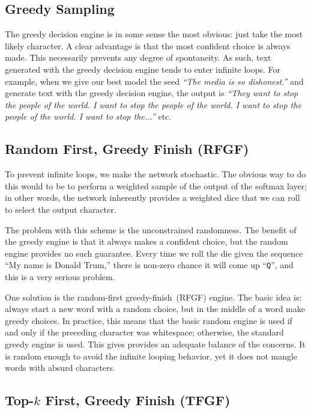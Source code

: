 \documentclass{article}
\begin{document}
\subsection{Greedy Sampling}\label{sec:greedySampling}

The greedy decision engine is in some sense the most obvious: just take the most likely character. A clear advantage is that the most confident choice is always made. This necessarily prevents any degree of spontaneity. As such, text generated with the greedy decision engine tends to enter infinite loops. For example, when we give our best model the seed \textit{``The media is so dishonest.''} and generate text with the greedy decision engine, the output is \textit{``They want to stop the people of the world. I want to stop the people of the world. I want to stop the people of the world. I want to stop the...''} etc.

\subsection{Random First, Greedy Finish (RFGF)}

To prevent infinite loops, we make the network stochastic. The obvious way to do this would to be to perform a weighted sample of the output of the softmax layer; in other words, the network inherently provides a weighted dice that we can roll to select the output character.

The problem with this scheme is the unconstrained randomness. The benefit of the greedy engine is that it always makes a confident choice, but the random engine provides no such guarantee. Every time we roll the die given the sequence ``My name is Donald Trum,'' there is non-zero chance it will come up ``\texttt{Q}'', and this is a very serious problem.

One solution is the random-first greedy-finish~(RFGF) engine. The basic idea is: always start a new word with a random choice, but in the middle of a word make greedy choices. In practice, this means that the basic random engine is used if and only if the preceding character was whitespace; otherwise, the standard greedy engine is used. This gives provides an adequate balance of the concerns. It is random enough to avoid the infinite looping behavior, yet it does not mangle words with absurd characters.

\subsection{Top-$\mathbf{\textit{k}}$ First, Greedy Finish (TFGF)}
\end{document}
